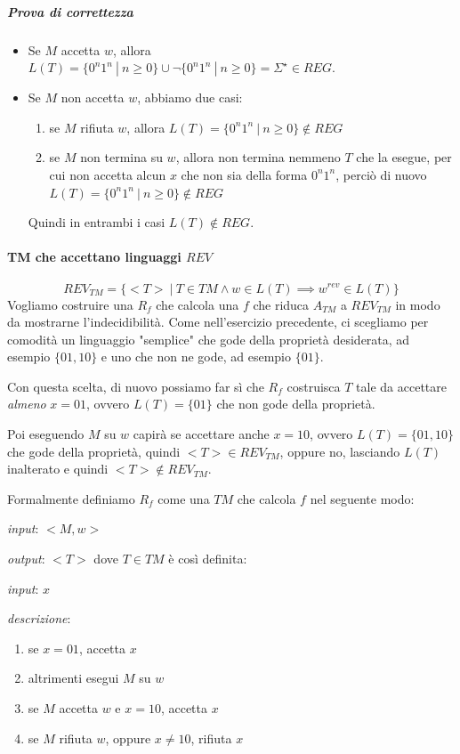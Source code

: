 \subparagraph{Prova di correttezza}

\begin{itemize}
\item Se $M$ accetta $w$, allora $L(T) = \{0^n1^n \ | \ n \geq 0\} \cup \neg \{0^n1^n \ | \ n \geq 0\} = \Sigma^{\star} \in REG$.

\item Se $M$ non accetta $w$, abbiamo due casi:
\begin{enumerate}
\item se $M$ rifiuta $w$, allora $L(T) = \{0^n1^n \ | \ n \geq 0\} \notin REG$
\item se $M$ non termina su $w$, allora non termina nemmeno $T$ che la esegue, per cui non accetta alcun $x$ che non sia della forma $0^n1^n$, perciò di nuovo $L(T) = \{ 0^n 1^n  \ | \ n \geq 0 \} \notin REG$
\end{enumerate}
Quindi in entrambi i casi $L(T) \notin REG$.
\end{itemize}

\paragraph{TM che accettano linguaggi $REV$}
\[
	REV_{TM} = \{ <T> \ | \ T \in TM \land w \in L(T) \implies w^{rev} \in L(T) \}
\]
Vogliamo costruire una $R_f$ che calcola una $f$ che riduca $A_{TM}$ a $REV_{TM}$ in modo da mostrarne l'indecidibilità. Come nell'esercizio precedente, ci scegliamo per comodità un linguaggio "semplice" che gode della proprietà desiderata, ad esempio $\{ 01, 10\}$ e uno che non ne gode, ad esempio $\{01\}$. 

Con questa scelta, di nuovo possiamo far sì che $R_f$ costruisca $T$ tale da accettare \textit{almeno} $x = 01$, ovvero $L(T) = \{01 \}$ che non gode della proprietà. 

Poi eseguendo $M$ su $w$ capirà se accettare anche $x = 10$, ovvero $L(T) = \{ 01, 10 \}$ che gode della proprietà, quindi $<T> \in REV_{TM}$, oppure no, lasciando $L(T)$ inalterato e quindi $<T> \notin REV_{TM}$.

Formalmente definiamo $R_f$ come una $TM$ che calcola $f$ nel seguente modo:
\begin{description}
\item \textit{input}: $<M, w>$
\item \textit{output}: $<T>$ dove $T \in TM$ è così definita:
\begin{description}
\item \textit{input}: $x$
\item \textit{descrizione}:
\begin{enumerate}
\item se $x = 01$, accetta $x$
\item altrimenti esegui $M$ su $w$
\item se $M$ accetta $w$ e $x = 10$, accetta $x$
\item se $M$ rifiuta $w$, oppure $x \neq 10$, rifiuta $x$

\end{enumerate}
\end{description}
\end{description}


